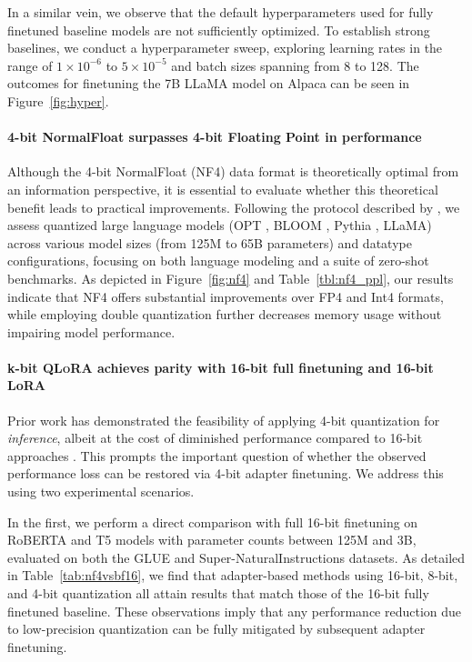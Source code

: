 In a similar vein, we observe that the default hyperparameters used for fully finetuned baseline models are not sufficiently optimized. To establish strong baselines, we conduct a hyperparameter sweep, exploring learning rates in the range of $1 \times 10^{-6}$ to $5 \times 10^{-5}$ and batch sizes spanning from 8 to 128. The outcomes for finetuning the 7B LLaMA model on Alpaca can be seen in Figure~\ref{fig:hyper}.

\paragraph{4-bit NormalFloat surpasses 4-bit Floating Point in performance} 

Although the 4-bit NormalFloat (NF4) data format is theoretically optimal from an information perspective, it is essential to evaluate whether this theoretical benefit leads to practical improvements. Following the protocol described by \citet{dettmers2022case}, we assess quantized large language models (OPT \citep{zhang2022opt}, BLOOM \cite{scao2022bloom}, Pythia \cite{biderman2023pythia}, LLaMA) across various model sizes (from 125M to 65B parameters) and datatype configurations, focusing on both language modeling and a suite of zero-shot benchmarks. As depicted in Figure~\ref{fig:nf4} and Table~\ref{tbl:nf4_ppl}, our results indicate that NF4 offers substantial improvements over FP4 and Int4 formats, while employing double quantization further decreases memory usage without impairing model performance.

\paragraph{k-bit \textsc{QLoRA} achieves parity with 16-bit full finetuning and 16-bit LoRA} Prior work has demonstrated the feasibility of applying 4-bit quantization for \emph{inference}, albeit at the cost of diminished performance compared to 16-bit approaches \citep{dettmers2022case,frantar2022gptq}. This prompts the important question of whether the observed performance loss can be restored via 4-bit adapter finetuning. We address this using two experimental scenarios.

In the first, we perform a direct comparison with full 16-bit finetuning on RoBERTA and T5 models with parameter counts between 125M and 3B, evaluated on both the GLUE and Super-NaturalInstructions datasets. As detailed in Table~\ref{tab:nf4vsbf16}, we find that adapter-based methods using 16-bit, 8-bit, and 4-bit quantization all attain results that match those of the 16-bit fully finetuned baseline. These observations imply that any performance reduction due to low-precision quantization can be fully mitigated by subsequent adapter finetuning.


